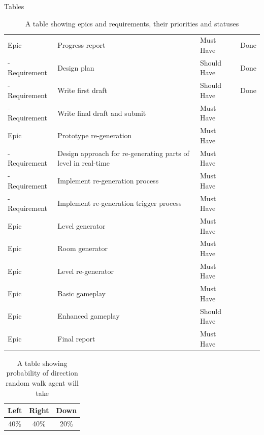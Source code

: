 \documentclass[progress]{cmpreport}
\begin{document}
\begin{section}{Tables}
\begin{table}[]
{\begin{tabular}{llll}
    Epic & Progress report & Must Have & Done \\
    - Requirement & Design plan & Should Have & Done \\
    - Requirement & Write first draft & Should Have & Done \\
    - Requirement & Write final draft and submit & Must Have &  \\ \hline
    Epic & Prototype re-generation & Must Have &  \\
    - Requirement & Design approach for re-generating parts of level in real-time & Must Have &  \\
    - Requirement & Implement re-generation process & Must Have &  \\
    - Requirement & Implement re-generation trigger process & Must Have &  \\ \hline
    Epic & Level generator & Must Have &  \\ \hline
    Epic & Room generator & Must Have &  \\ \hline
    Epic & Level re-generator & Must Have &  \\ \hline
    Epic & Basic gameplay & Must Have &  \\ \hline
    Epic & Enhanced gameplay & Should Have &  \\ \hline
    Epic & Final report & Must Have &  \\ \hline
    \end{tabular}%
    }
    \caption{A table showing epics and requirements, their priorities and statuses}
    \label{tab:epicreqs}
\end{table}

\begin{table}[h!]
    \centering
    \begin{tabular}{ |c|c|c| }
    \hline
    Left & Right & Down \\ 
    \hline
    40\% & 40\% & 20\%\\ 
    \hline
    \end{tabular}
    \caption{A table showing probability of direction random walk agent will take}
    \label{tab:probdirs}
\end{table}

\end{section}
\end{document}
